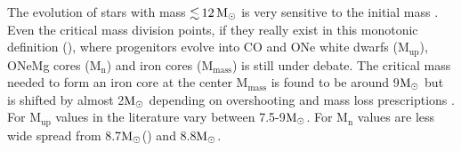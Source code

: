 \documentclass[fleqn,usenatbib]{mnras}
\newcommand{\solm}{\xspace\ensuremath{\rm{M_{\odot}}}\xspace}
\begin{document}
The evolution of stars with mass $\mathord{\lesssim}\,12\, \solm$ is very sensitive to the initial mass \citep{Woosley2015}.
Even the critical mass division points, if they really exist in this monotonic definition (\cite{Woosley2015}), where progenitors evolve into CO and ONe white dwarfs ($\mathrm{M_{up}}$), ONeMg cores ($\mathrm{M_{n}}$) and iron cores ($\mathrm{M_{mass}}$) is still under debate. 
The critical mass needed to form an iron core at the center $\mathrm{M_{mass}}$ is found to be around 9\solm but is shifted by almost 2\solm depending on overshooting and mass loss prescriptions \cite{Siess2007}. 
For $\mathrm{M_{up}}$ values in the literature vary between 7.5-9\solm \citealt{Poelarends2008,Siess2007}. For $\mathrm{M_{n}}$ values are less wide spread from 8.7\solm (\cite{Jones2013}) and 8.8\solm \cite{Nomoto1984}.
\end{document}
